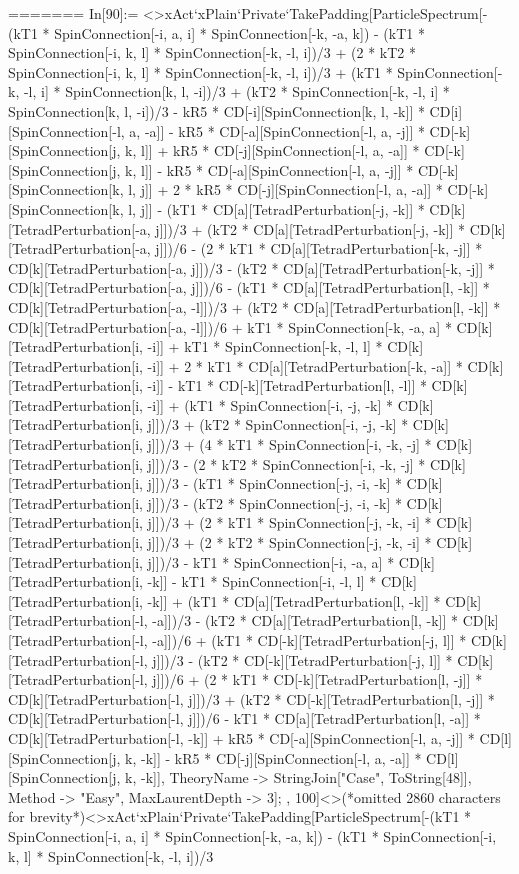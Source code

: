=======
In[90]:= <>xAct`xPlain`Private`TakePadding[ParticleSpectrum[-(kT1 * SpinConnection[-i, a, i] * SpinConnection[-k, -a, k]) - (kT1 * SpinConnection[-i, k, l] * SpinConnection[-k, -l, i])/3 + (2 * kT2 * SpinConnection[-i, k, l] * SpinConnection[-k, -l, i])/3 + (kT1 * SpinConnection[-k, -l, i] * SpinConnection[k, l, -i])/3 + (kT2 * SpinConnection[-k, -l, i] * SpinConnection[k, l, -i])/3 - kR5 * CD[-i][SpinConnection[k, l, -k]] * CD[i][SpinConnection[-l, a, -a]] - kR5 * CD[-a][SpinConnection[-l, a, -j]] * CD[-k][SpinConnection[j, k, l]] + kR5 * CD[-j][SpinConnection[-l, a, -a]] * CD[-k][SpinConnection[j, k, l]] - kR5 * CD[-a][SpinConnection[-l, a, -j]] * CD[-k][SpinConnection[k, l, j]] + 2 * kR5 * CD[-j][SpinConnection[-l, a, -a]] * CD[-k][SpinConnection[k, l, j]] - (kT1 * CD[a][TetradPerturbation[-j, -k]] * CD[k][TetradPerturbation[-a, j]])/3 + (kT2 * CD[a][TetradPerturbation[-j, -k]] * CD[k][TetradPerturbation[-a, j]])/6 - (2 * kT1 * CD[a][TetradPerturbation[-k, -j]] * CD[k][TetradPerturbation[-a, j]])/3 - (kT2 * CD[a][TetradPerturbation[-k, -j]] * CD[k][TetradPerturbation[-a, j]])/6 - (kT1 * CD[a][TetradPerturbation[l, -k]] * CD[k][TetradPerturbation[-a, -l]])/3 + (kT2 * CD[a][TetradPerturbation[l, -k]] * CD[k][TetradPerturbation[-a, -l]])/6 + kT1 * SpinConnection[-k, -a, a] * CD[k][TetradPerturbation[i, -i]] + kT1 * SpinConnection[-k, -l, l] * CD[k][TetradPerturbation[i, -i]] + 2 * kT1 * CD[a][TetradPerturbation[-k, -a]] * CD[k][TetradPerturbation[i, -i]] - kT1 * CD[-k][TetradPerturbation[l, -l]] * CD[k][TetradPerturbation[i, -i]] + (kT1 * SpinConnection[-i, -j, -k] * CD[k][TetradPerturbation[i, j]])/3 + (kT2 * SpinConnection[-i, -j, -k] * CD[k][TetradPerturbation[i, j]])/3 + (4 * kT1 * SpinConnection[-i, -k, -j] * CD[k][TetradPerturbation[i, j]])/3 - (2 * kT2 * SpinConnection[-i, -k, -j] * CD[k][TetradPerturbation[i, j]])/3 - (kT1 * SpinConnection[-j, -i, -k] * CD[k][TetradPerturbation[i, j]])/3 - (kT2 * SpinConnection[-j, -i, -k] * CD[k][TetradPerturbation[i, j]])/3 + (2 * kT1 * SpinConnection[-j, -k, -i] * CD[k][TetradPerturbation[i, j]])/3 + (2 * kT2 * SpinConnection[-j, -k, -i] * CD[k][TetradPerturbation[i, j]])/3 - kT1 * SpinConnection[-i, -a, a] * CD[k][TetradPerturbation[i, -k]] - kT1 * SpinConnection[-i, -l, l] * CD[k][TetradPerturbation[i, -k]] + (kT1 * CD[a][TetradPerturbation[l, -k]] * CD[k][TetradPerturbation[-l, -a]])/3 - (kT2 * CD[a][TetradPerturbation[l, -k]] * CD[k][TetradPerturbation[-l, -a]])/6 + (kT1 * CD[-k][TetradPerturbation[-j, l]] * CD[k][TetradPerturbation[-l, j]])/3 - (kT2 * CD[-k][TetradPerturbation[-j, l]] * CD[k][TetradPerturbation[-l, j]])/6 + (2 * kT1 * CD[-k][TetradPerturbation[l, -j]] * CD[k][TetradPerturbation[-l, j]])/3 + (kT2 * CD[-k][TetradPerturbation[l, -j]] * CD[k][TetradPerturbation[-l, j]])/6 - kT1 * CD[a][TetradPerturbation[l, -a]] * CD[k][TetradPerturbation[-l, -k]] + kR5 * CD[-a][SpinConnection[-l, a, -j]] * CD[l][SpinConnection[j, k, -k]] - kR5 * CD[-j][SpinConnection[-l, a, -a]] * CD[l][SpinConnection[j, k, -k]], TheoryName -> StringJoin["Case", ToString[48]], Method -> "Easy", MaxLaurentDepth -> 3]; , 100]<>(*omitted 2860 characters for brevity*)<>xAct`xPlain`Private`TakePadding[ParticleSpectrum[-(kT1 * SpinConnection[-i, a, i] * SpinConnection[-k, -a, k]) - (kT1 * SpinConnection[-i, k, l] * SpinConnection[-k, -l, i])/3 